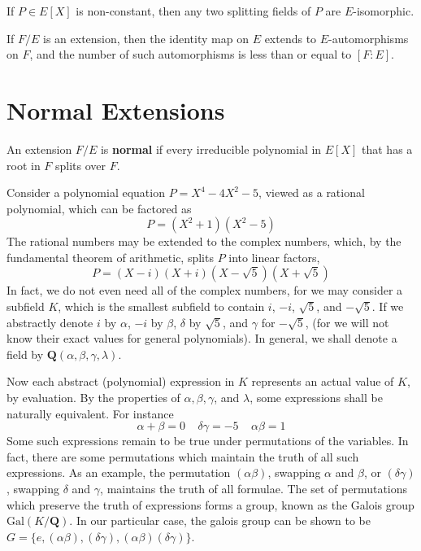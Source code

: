 \begin{corollary}
    If $P \in E[X]$ is non-constant, then any two splitting fields of $P$ are $E$-isomorphic.
\end{corollary}

\begin{corollary}
    If $F/E$ is an extension, then the identity map on $E$ extends to $E$-automorphisms on $F$, and the number of such automorphisms is less than or equal to $[F:E]$.
\end{corollary}





\section{Normal Extensions}

An extension $F/E$ is {\bf normal} if every irreducible polynomial in $E[X]$ that has a root in $F$ splits over $F$.





Consider a polynomial equation $P = X^4 - 4X^2 - 5$, viewed as a rational polynomial, which can be factored as
%
\[ P = (X^2 + 1)(X^2 - 5) \]
%
The rational numbers may be extended to the complex numbers, which, by the fundamental theorem of arithmetic, splits $P$ into linear factors,
%
\[ P = (X - i)(X + i)(X - \sqrt{5})(X + \sqrt{5}) \]
%
In fact, we do not even need all of the complex numbers, for we may consider a subfield $K$, which is the smallest subfield to contain $i$, $-i$, $\sqrt{5}$, and $-\sqrt{5}$. If we abstractly denote $i$ by $\alpha$, $-i$ by $\beta$, $\delta$ by $\sqrt{5}$, and $\gamma$ for $-\sqrt{5}$, (for we will not know their exact values for general polynomials). In general, we shall denote a field by $\mathbf{Q}(\alpha, \beta, \gamma, \lambda)$.

Now each abstract (polynomial) expression in $K$ represents an actual value of $K$, by evaluation. By the properties of $\alpha, \beta, \gamma$, and $\lambda$, some expressions shall be naturally equivalent. For instance
%
\[ \alpha + \beta = 0\ \ \ \ \ \delta \gamma = -5\ \ \ \ \ \alpha \beta = 1 \]
%
Some such expressions remain to be true under permutations of the variables. In fact, there are some permutations which maintain the truth of all such expressions. As an example, the permutation $(\alpha \beta)$, swapping $\alpha$ and $\beta$, or $(\delta \gamma)$, swapping $\delta$ and $\gamma$, maintains the truth of all formulae. The set of permutations which preserve the truth of expressions forms a group, known as the Galois group $\text{Gal}(K / \mathbf{Q})$. In our particular case, the galois group can be shown to be $G = \{ e, (\alpha \beta), (\delta \gamma), (\alpha \beta) (\delta \gamma) \}$.

